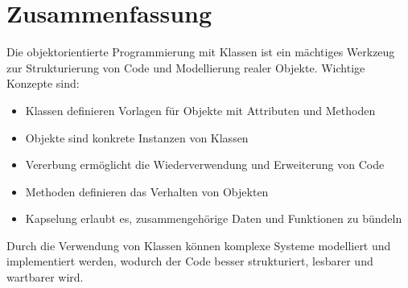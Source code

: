 \section{Zusammenfassung}
Die objektorientierte Programmierung mit Klassen ist ein mächtiges Werkzeug zur Strukturierung von Code und Modellierung realer Objekte. Wichtige Konzepte sind:

\begin{itemize}
    \item Klassen definieren Vorlagen für Objekte mit Attributen und Methoden
    \item Objekte sind konkrete Instanzen von Klassen
    \item Vererbung ermöglicht die Wiederverwendung und Erweiterung von Code
    \item Methoden definieren das Verhalten von Objekten
    \item Kapselung erlaubt es, zusammengehörige Daten und Funktionen zu bündeln
\end{itemize}

Durch die Verwendung von Klassen können komplexe Systeme modelliert und implementiert werden, wodurch der Code besser strukturiert, lesbarer und wartbarer wird.